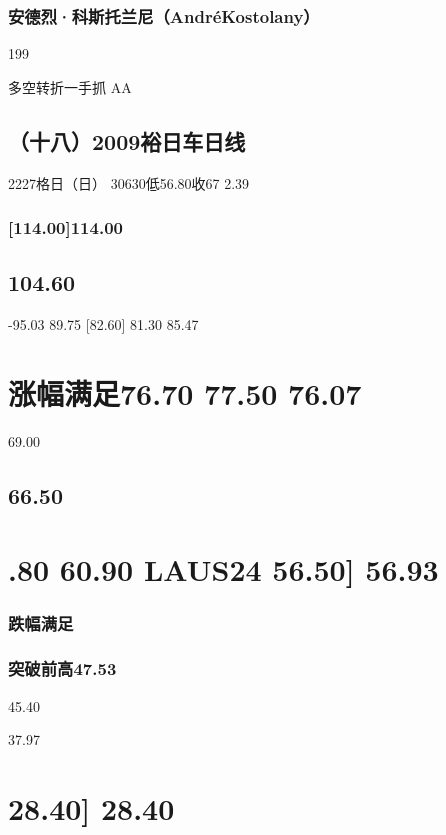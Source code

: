 \documentclass{article}
\begin{document}
\subsubsection{安德烈·科斯托兰尼（AndréKostolany）}

199

\clearpage

多空转折一手抓 AA

\subsection{（十八）2009裕日车日线}

2227格日（日） 30630低56.80收67 2.39

\subsubsection{[114.00]114.00}

\subsection{104.60}

-95.03 89.75 [82.60] 81.30 85.47

\section{涨幅满足76.70 77.50 76.07}

69.00

\subsection{66.50}

\section{.80 60.90 LAUS24 56.50] 56.93}

\subsubsection{跌幅满足}

\subsubsection{突破前高47.53}

45.40

37.97

\section{28.40] 28.40}
\end{document}
